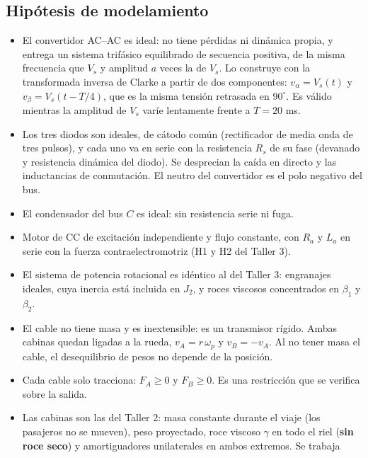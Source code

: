 \documentclass[10pt,a4paper,twocolumn]{article}
\begin{document}
\subsection*{Hipótesis de modelamiento}

\begin{itemize}
  \item[\textbf{H1}] El convertidor AC--AC es ideal: no tiene pérdidas ni dinámica propia, y
        entrega un sistema trifásico equilibrado de secuencia positiva, de la misma
        frecuencia que $V_s$ y amplitud $a$ veces la de $V_s$. Lo construye con la
        transformada inversa de Clarke a partir de dos componentes: $v_\alpha = V_s(t)$ y
        $v_\beta = V_s(t-T/4)$, que es la misma tensión retrasada en $90^\circ$. Es válido
        mientras la amplitud de $V_s$ varíe lentamente frente a $T = 20$ ms.
  \item[\textbf{H2}] Los tres diodos son ideales, de cátodo común (rectificador de media onda
        de tres pulsos), y cada uno va en serie con la resistencia $R_s$ de su fase
        (devanado y resistencia dinámica del diodo). Se desprecian la caída en directo y las
        inductancias de conmutación. El neutro del convertidor es el polo negativo del bus.
  \item[\textbf{H3}] El condensador del bus $C$ es ideal: sin resistencia serie ni fuga.
  \item[\textbf{H4}] Motor de CC de excitación independiente y flujo constante, con $R_a$ y
        $L_a$ en serie con la fuerza contraelectromotriz (H1 y H2 del Taller 3).
  \item[\textbf{H5}] El sistema de potencia rotacional es idéntico al del Taller 3: engranajes
        ideales, cuya inercia está incluida en $J_2$, y roces viscosos concentrados en
        $\beta_1$ y $\beta_2$.
  \item[\textbf{H6}] El cable no tiene masa y es inextensible: es un transmisor rígido. Ambas
        cabinas quedan ligadas a la rueda, $v_A = r\,\omega_p$ y $v_B = -v_A$. Al no tener
        masa el cable, el desequilibrio de pesos no depende de la posición.
  \item[\textbf{H7}] Cada cable solo tracciona: $F_A \ge 0$ y $F_B \ge 0$. Es una
        restricción que se verifica sobre la salida.
  \item[\textbf{H8}] Las cabinas son las del Taller 2: masa constante durante el viaje (los
        pasajeros no se mueven), peso proyectado, roce viscoso $\gamma$ en todo el riel
        (\textbf{sin roce seco}) y amortiguadores unilaterales en ambos extremos. Se trabaja

\end{itemize}
\end{document}
